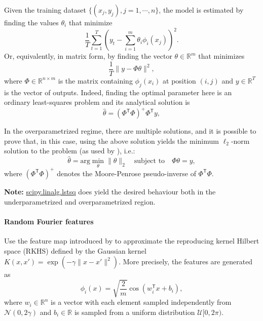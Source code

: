 \documentclass[a4paper,10pt]{article}
\newcommand{\trnsp}{\mathsf{T}}
\newenvironment{note}
{
\begin{center}
\begin{lrbox}{\mybox}
\begin{minipage}{42em}}
{\end{minipage}
\end{lrbox}\fbox{\usebox{\mybox}}
\end{center}}
\begin{document}
    
    Given the training dataset $\{(x_j, y_j), j=1, \cdots, n\}$, the model is estimated by finding the values $\theta_i$ that minimize
    \begin{equation}
        \label{eq:estimation}
        \frac{1}{T}\sum_{t = 1}^T\left( y_t - \sum_{i=1}^m \theta_i \phi_i(x_j)\right)^2.
    \end{equation}
    Or, equivalently, in matrix form, by finding the vector $\theta \in \mathbb{R}^m$ that minimizes
    \begin{equation}
         \label{eq:estimation-matrix}
        \frac{1}{T}\|y - \Phi \theta\|^2,  
    \end{equation}
    where $\Phi \in\mathbb{R}^{n\times m}$ is the matrix containing  $\phi_j(x_i)$ at position $(i, j)$ and $y \in \mathbb{R}^T$ is the vector of outputs. Indeed, finding  the  optimal  parameter  here  is  an  ordinary  least-squares problem and its analytical solution is
    \begin{equation}
    \label{eq:ls-sol}
    \hat{\theta} = (\Phi^\trnsp \Phi)^{+}\Phi^\trnsp y,
    \end{equation}

    In the overparametrized regime, there are multiple solutions, and it is possible to prove that, in this case,  using the above solution yields the minimum $\ell_2$-norm solution to the problem (as used by \citet{belkin_reconciling_2019}), i.e.:
    \begin{equation}
    \label{eq:min-norm-solution}
    \hat{\theta} = \text{arg}\min_\theta \|\theta\|_2 \quad \text{subject to}\quad\Phi\theta = y,
    \end{equation}
    where $(\Phi^\trnsp \Phi)^{+}$ denotes the Moore-Penrose pseudo-inverse of $\Phi^\trnsp \Phi$.  
    
    \begin{note}
    \textbf{Note:} \href{https://docs.scipy.org/doc/scipy/reference/generated/scipy.linalg.lstsq.html}{scipy.linalg.lstsq} does yield the desired behaviour both in the underparametrized and overparametrized region.
    \end{note}
    
    
    \paragraph{Random Fourier features} Use the feature map introduced by 
    \citet{rahimi_random_2008} to approximate the reproducing kernel Hilbert space (RKHS) defined by the Gaussian kernel ${K(x, x') = \exp(-\gamma \|x - x'\|^2)}$. More precisely, the features are generated as
    \begin{equation}
        \phi_i(x) = \sqrt{\frac{2}{m}}\cos(w_i^\trnsp x + b_i),
    \end{equation}
    where $w_i\in\mathbb{R}^n$ is a vector with each element sampled independently from $\mathcal{N}(0, 2\gamma)$ and $b_i\in\mathbb{R}$ is sampled from a uniform distribution $\mathcal{U}[0, 2\pi)$. 
    
\end{document}
